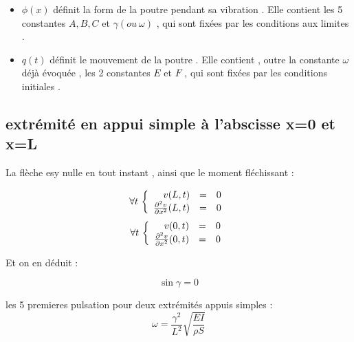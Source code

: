 \documentclass[a4paper,10pt]{report} %
\begin{document}
\begin{itemize}


    \item $\phi (x)$  définit la form de la poutre pendant sa vibration . Elle contient les 5 constantes $A, B, C$ et $\gamma (ou\ \omega)$ , qui sont fixées par les conditions aux limites .
    
    
    
    \item $q(t)$ définit le mouvement de la poutre . Elle contient , outre la constante $\omega$ déjà évoquée , les 2 constantes $E$ et $F$ , qui sont fixées par les conditions initiales .
    
    
    
\end{itemize}




\subsection{extrémité en appui simple à l'abscisse x=0 et x=L}

La flèche esy nulle en tout instant , ainsi que le moment fléchissant :

\begin{equation}
    \forall t\, 
    \left\{
    \begin{array}{r c l}v(L,t)&=&0\\\frac{\partial ^2v}{\partial x^2}(L,t)&=&0
    \end{array}
    \right.
\end{equation}
\begin{equation}
    \forall t\,
    \left \{
    \begin{array}{r c l}v(0,t)&=&0\\\frac{\partial^2v}{\partial x^2}(0,t)&=&0
    \end{array}
    \right.
\end{equation}

Et on en déduit :

\begin{equation}
    \sin\gamma=0
\end{equation}

les 5 premieres pulsation pour deux extrémités appuis simples :
$$\omega=\frac{\gamma^2}{L^2}\sqrt{\frac{EI}{\rho S}}$$







\end{document}

